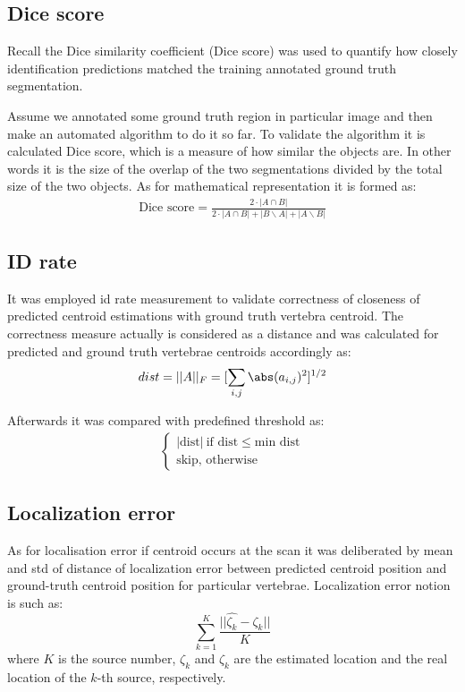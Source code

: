 \subsection{Dice score}
Recall the \cite{Thada2013} Dice similarity coefficient (Dice score) was used to quantify how closely identification predictions matched the training annotated ground truth segmentation. 

Assume we annotated some ground truth region in particular image and then make an automated algorithm to do it so far. To validate the algorithm it is calculated Dice score, which is a measure of how similar the objects are. In other words it is the size of the overlap of the two segmentations divided by the total size of the two objects. As for mathematical representation it is formed as:
\begin{align*}
  \text{Dice score} = \frac{2\cdot|A\cap B|}{2\cdot|A\cap B| + |B\backslash A| + |A\backslash B|}
\end{align*}

\subsection{ID rate}
It was employed id rate measurement to validate correctness of closeness of predicted centroid estimations with ground truth vertebra centroid. The correctness measure actually is considered as a distance and was calculated for predicted and ground truth vertebrae centroids accordingly as:
\[ dist = ||A||_F = [\sum_{i,j} \abs(a_{i,j})^2]^{1/2} \]

Afterwards it was compared with predefined threshold as:
\begin{align*}
\begin{cases}
\lvert \text{dist} \rvert\ \mbox{if } \text{dist} \leq \text{min dist} \\ 
\text{skip}, \mbox{ otherwise} \end{cases}
\end{align*}

\subsection{Localization error}
As for localisation error if centroid occurs at the scan it was deliberated by mean and std of distance of localization error between predicted centroid position and ground-truth centroid position for particular vertebrae. Localization error notion is such as:
\[ \sum_{k=1}^K \frac{||\hat{\zeta_k} - \zeta_k || }{K} \]
where $K$ is the source number, $\hat{\zeta_k}$ and $\zeta_k$ are the estimated location and the real location of the $k$-th source, respectively.

